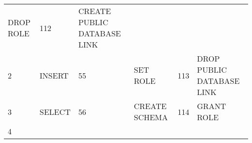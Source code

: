 \begin{longtable}[]{@{}llllll@{}}
\begin{minipage}[t]{0.24\columnwidth}
DROP ROLE\strut
\end{minipage} & \begin{minipage}[t]{0.06\columnwidth}\raggedright\strut
112\strut
\end{minipage} & \begin{minipage}[t]{0.24\columnwidth}\raggedright\strut
CREATE PUBLIC DATABASE LINK\strut
\end{minipage}\tabularnewline
\begin{minipage}[t]{0.06\columnwidth}\raggedright\strut
2\strut
\end{minipage} & \begin{minipage}[t]{0.19\columnwidth}\raggedright\strut
INSERT\strut
\end{minipage} & \begin{minipage}[t]{0.06\columnwidth}\raggedright\strut
55\strut
\end{minipage} & \begin{minipage}[t]{0.24\columnwidth}\raggedright\strut
SET ROLE\strut
\end{minipage} & \begin{minipage}[t]{0.06\columnwidth}\raggedright\strut
113\strut
\end{minipage} & \begin{minipage}[t]{0.24\columnwidth}\raggedright\strut
DROP PUBLIC DATABASE LINK\strut
\end{minipage}\tabularnewline
\begin{minipage}[t]{0.06\columnwidth}\raggedright\strut
3\strut
\end{minipage} & \begin{minipage}[t]{0.19\columnwidth}\raggedright\strut
SELECT\strut
\end{minipage} & \begin{minipage}[t]{0.06\columnwidth}\raggedright\strut
56\strut
\end{minipage} & \begin{minipage}[t]{0.24\columnwidth}\raggedright\strut
CREATE SCHEMA\strut
\end{minipage} & \begin{minipage}[t]{0.06\columnwidth}\raggedright\strut
114\strut
\end{minipage} & \begin{minipage}[t]{0.24\columnwidth}\raggedright\strut
GRANT ROLE\strut
\end{minipage}\tabularnewline
\begin{minipage}[t]{0.06\columnwidth}\raggedright\strut
4\strut
\end{minipage} & \begin{minipage}[t]{0.19\columnwidth}\raggedright\strut

\end{minipage}
\end{longtable}
